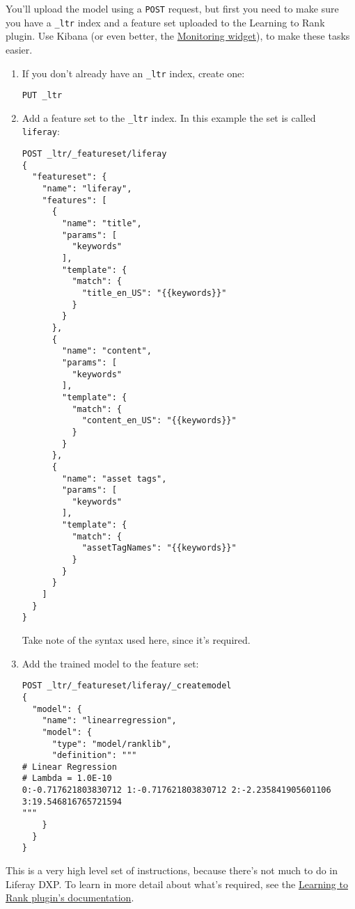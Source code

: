 You'll upload the model using a \texttt{POST} request, but first you
need to make sure you have a \texttt{\_ltr} index and a feature set
uploaded to the Learning to Rank plugin. Use Kibana (or even better, the
\href{/docs/7-2/deploy/-/knowledge_base/d/installing-liferay-enterprise-search-monitoring}{Monitoring
widget}), to make these tasks easier.

\begin{enumerate}
\def\labelenumi{\arabic{enumi}.}
\item
  If you don't already have an \texttt{\_ltr} index, create one:

\begin{verbatim}
PUT _ltr
\end{verbatim}
\item
  Add a feature set to the \texttt{\_ltr} index. In this example the set
  is called \texttt{liferay}:

\begin{verbatim}
POST _ltr/_featureset/liferay
{
  "featureset": {
    "name": "liferay",
    "features": [
      {
        "name": "title",
        "params": [
          "keywords"
        ],
        "template": {
          "match": {
            "title_en_US": "{{keywords}}"
          }
        }
      },
      {
        "name": "content",
        "params": [
          "keywords"
        ],
        "template": {
          "match": {
            "content_en_US": "{{keywords}}"
          }
        }
      },
      {
        "name": "asset tags",
        "params": [
          "keywords"
        ],
        "template": {
          "match": {
            "assetTagNames": "{{keywords}}"
          }
        }
      }
    ]
  }
}
\end{verbatim}

  Take note of the syntax used here, since it's required.
\item
  Add the trained model to the feature set:

\begin{verbatim}
POST _ltr/_featureset/liferay/_createmodel
{
  "model": {
    "name": "linearregression",
    "model": {
      "type": "model/ranklib",
      "definition": """
# Linear Regression
# Lambda = 1.0E-10
0:-0.717621803830712 1:-0.717621803830712 2:-2.235841905601106 3:19.546816765721594
"""
    }
  }
}
\end{verbatim}
\end{enumerate}

This is a very high level set of instructions, because there's not much
to do in Liferay DXP. To learn in more detail about what's required, see
the
\href{https://elasticsearch-learning-to-rank.readthedocs.io/en/latest/index.html}{Learning
to Rank plugin's documentation}.

